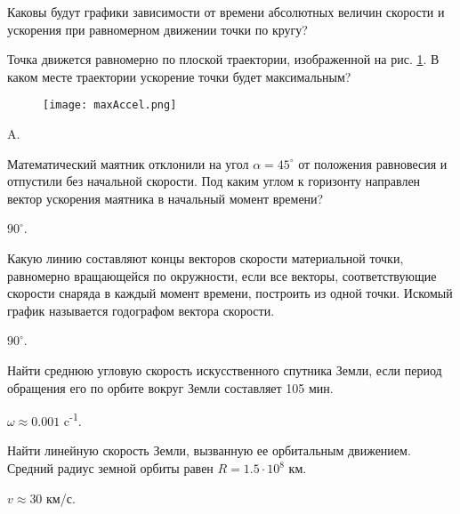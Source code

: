 \qualProblems

\begin{ex} %
Каковы будут графики зависимости от времени абсолютных величин скорости и ускорения при равномерном движении точки по кругу?
\begin{ans}
\end{ans}
\end{ex}

\begin{ex} %
Точка движется равномерно по плоской траектории, изображенной на рис. \ref{maxAccel}. В каком месте траектории ускорение точки будет максимальным?

\begin{figure}[h]
\centering
\texttt{[image: maxAccel.png]}
\caption{}
\label{maxAccel}
\end{figure}
\begin{ans}
A.
\end{ans}
\end{ex}

\begin{ex} %
Математический маятник отклонили на угол $\alpha = 45^{\circ}$ от положения равновесия и отпустили без начальной скорости. Под каким углом к горизонту направлен вектор ускорения маятника в начальный момент времени?
\begin{ans}
$90^{\circ}$.
\end{ans}
\end{ex}

\begin{ex}
Какую линию составляют концы векторов скорости материальной точки, равномерно вращающейся по окружности, если все векторы, соответствующие скорости снаряда в каждый момент времени, построить из одной точки. Искомый график называется годографом вектора скорости.
\begin{ans}
$90^{\circ}$.
\end{ans}
\end{ex}


\simpleProblems

\begin{ex} %
Найти среднюю угловую скорость искусственного спутника Земли, если период обращения его по орбите вокруг Земли составляет 105 мин.
\begin{ans}
$\omega \approx 0.001$ c\textsuperscript{-1}.
\end{ans}
\end{ex}

\begin{ex} %
Найти линейную скорость Земли, вызванную ее орбитальным движением. Средний радиус земной орбиты равен $R = 1.5 \cdot 10^8$ км.
\begin{ans}
$v \approx 30$ км/с.
\end{ans}
\end{ex}

